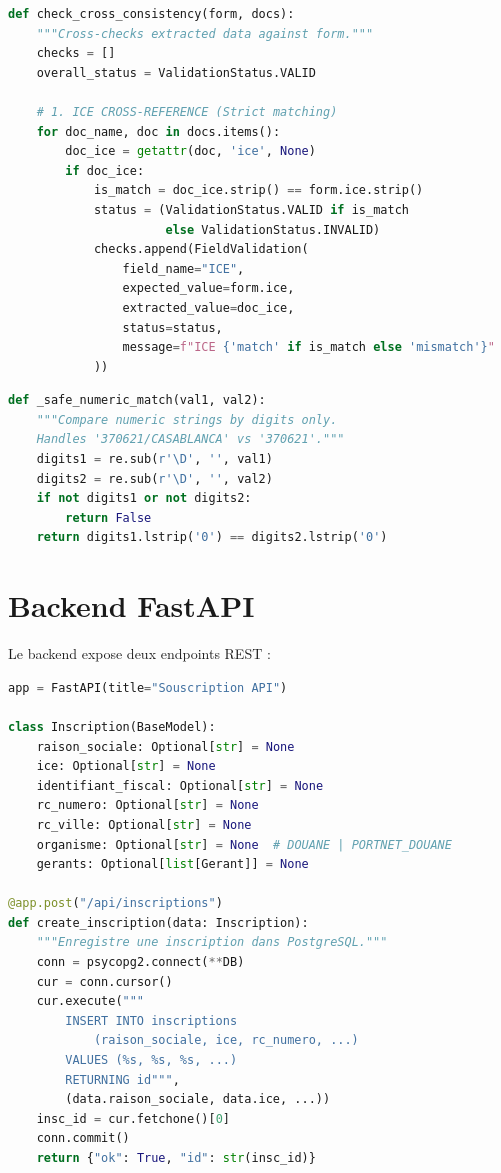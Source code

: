 \begin{lstlisting}[language=Python, caption={Cross-r\'{e}f\'{e}rence ICE (cross\_reference.py).}, label={lst:cross-ref-ice}]
def check_cross_consistency(form, docs):
    """Cross-checks extracted data against form."""
    checks = []
    overall_status = ValidationStatus.VALID
    
    # 1. ICE CROSS-REFERENCE (Strict matching)
    for doc_name, doc in docs.items():
        doc_ice = getattr(doc, 'ice', None)
        if doc_ice:
            is_match = doc_ice.strip() == form.ice.strip()
            status = (ValidationStatus.VALID if is_match
                      else ValidationStatus.INVALID)
            checks.append(FieldValidation(
                field_name="ICE",
                expected_value=form.ice,
                extracted_value=doc_ice,
                status=status,
                message=f"ICE {'match' if is_match else 'mismatch'}"
            ))
\end{lstlisting}

\begin{lstlisting}[language=Python, caption={Comparaison num\'{e}rique s\'{e}curis\'{e}e du RC (cross\_reference.py).}, label={lst:safe-numeric}]
def _safe_numeric_match(val1, val2):
    """Compare numeric strings by digits only.
    Handles '370621/CASABLANCA' vs '370621'."""
    digits1 = re.sub(r'\D', '', val1)
    digits2 = re.sub(r'\D', '', val2)
    if not digits1 or not digits2:
        return False
    return digits1.lstrip('0') == digits2.lstrip('0')
\end{lstlisting}

\section{Backend FastAPI}

Le backend expose deux endpoints REST :

\begin{lstlisting}[language=Python, caption={Backend FastAPI (app.py).}, label={lst:fastapi-app}]
app = FastAPI(title="Souscription API")

class Inscription(BaseModel):
    raison_sociale: Optional[str] = None
    ice: Optional[str] = None
    identifiant_fiscal: Optional[str] = None
    rc_numero: Optional[str] = None
    rc_ville: Optional[str] = None
    organisme: Optional[str] = None  # DOUANE | PORTNET_DOUANE
    gerants: Optional[list[Gerant]] = None

@app.post("/api/inscriptions")
def create_inscription(data: Inscription):
    """Enregistre une inscription dans PostgreSQL."""
    conn = psycopg2.connect(**DB)
    cur = conn.cursor()
    cur.execute("""
        INSERT INTO inscriptions
            (raison_sociale, ice, rc_numero, ...)
        VALUES (%s, %s, %s, ...)
        RETURNING id""",
        (data.raison_sociale, data.ice, ...))
    insc_id = cur.fetchone()[0]
    conn.commit()
    return {"ok": True, "id": str(insc_id)}
\end{lstlisting}

